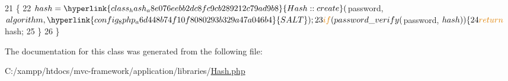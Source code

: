 \begin{DoxyCode}
21                                                          \{
22         $hash = \hyperlink{class_hash_a8e076eebb2dc8fc9cb289212c79ad9b8}{Hash::create}($password, $algorithm, \hyperlink{config_8php_a6d448b74f10f8080293b329a47a046b4}{SALT});
23         \textcolor{keywordflow}{if} (password\_verify($password, $hash)) \{
24             \textcolor{keywordflow}{return} $hash;   
25         \}
26     \}
\end{DoxyCode}


The documentation for this class was generated from the following file\+:\begin{DoxyCompactItemize}
\item 
C\+:/xampp/htdocs/mvc-\/framework/application/libraries/\hyperlink{_hash_8php}{Hash.\+php}\end{DoxyCompactItemize}
